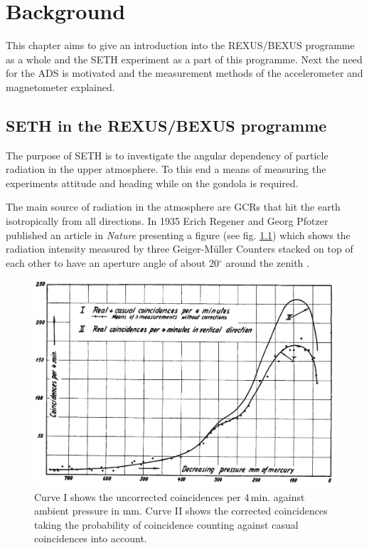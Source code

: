 \chapter{Background \label{ch:background}}
This chapter aims to give an introduction into the \acf{REXUS}/\acf{BEXUS} programme as a whole and the \acf{SETH} experiment as a part of this programme. Next the need for the \acf{ADS} is motivated and the measurement methods of the accelerometer and magnetometer explained.

\section{\acs{SETH} in the \acs{REXUS}/\acs{BEXUS} programme \label{sec:bg:seth_and_bx_programme}}

The purpose of \ac{SETH} is to investigate the angular dependency of particle radiation in the upper atmosphere. To this end a means of measuring the experiments attitude and heading while on the gondola is required.

The main source of radiation in the atmosphere are \acp{GCR} that hit the earth isotropically from all directions. In 1935 Erich Regener and Georg Pfotzer published an article in \textit{Nature} presenting a figure (see fig. \ref{fig:regener1935}) which shows the radiation intensity measured by three Geiger-Müller Counters stacked on top of each other to have an aperture angle of about 20$^\circ$ around the zenith \parencite{regener-pfotzer-1935}.

\begin{figure}[H]
    \centering
    \includegraphics[width=0.8\linewidth]{images/01_background/original_regener_pfotzer.png}
    \caption[Regener-Pfotzer-Maximum as shown in \parencite{regener-pfotzer-1935}]{Curve I shows the uncorrected coincidences per 4\,min. against ambient pressure in mm. Curve II shows the corrected coincidences taking the probability of coincidence counting against casual coincidences into account\parencite{regener-pfotzer-1935}.}
    \label{fig:regener1935}
\end{figure}

